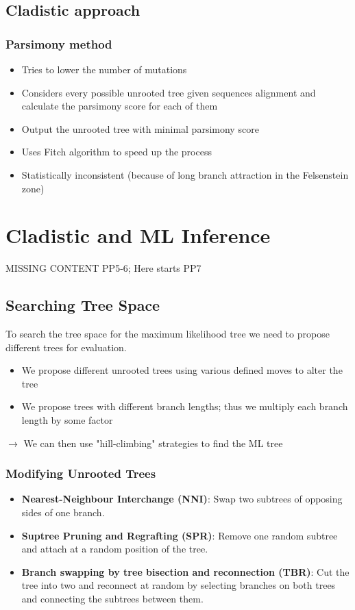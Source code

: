 \documentclass{article}
\begin{document}
\begin{multicols*}{3}
\subsection{Cladistic approach}
\subsubsection{Parsimony method}
\begin{itemize}
    \item Tries to lower the number of mutations
    \item Considers every possible unrooted tree given sequences alignment and calculate the parsimony score for each of them
    \item Output the unrooted tree with minimal parsimony score
    \item Uses Fitch algorithm to speed up the process
    \item Statistically inconsistent (because of long branch attraction in the Felsenstein zone)
\end{itemize}

\section{Cladistic and ML Inference}
{\color{red} MISSING CONTENT PP5-6; Here starts PP7}

\subsection{Searching Tree Space}
To search the tree space for the maximum likelihood tree we need to propose different trees for evaluation. 
\begin{itemize}
    \item We propose different unrooted trees using various defined moves to alter the tree
    \item We propose trees with different branch lengths; thus we multiply each branch length by some factor
\end{itemize}
$\rightarrow$ We can then use "hill-climbing" strategies to find the ML tree

\subsubsection{Modifying Unrooted Trees}

\begin{itemize}
    \item \textbf{Nearest-Neighbour Interchange (NNI)}: Swap two subtrees of opposing sides of one branch. 
    \item \textbf{Suptree Pruning and Regrafting (SPR)}: Remove one random subtree and attach at a random position of the tree.
    \item \textbf{Branch swapping by tree bisection and reconnection (TBR)}: Cut the tree into two and reconnect at random by selecting branches on both trees and connecting the subtrees between them. 
\end{itemize}


\end{multicols*}
\end{document}
